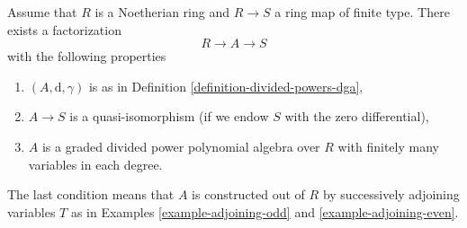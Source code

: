 \begin{lemma}
\label{lemma-tate-resolution}
Assume that $R$ is a Noetherian ring and
$R \to S$ a ring map of finite type. There exists a factorization
$$
R \to A \to S
$$
with the following properties
\begin{enumerate}
\item $(A, \text{d}, \gamma)$ is as in
Definition \ref{definition-divided-powers-dga},
\item $A \to S$ is a quasi-isomorphism (if we endow $S$ with
the zero differential),
\item $A$ is a graded divided power polynomial algebra over $R$
with finitely many variables in each degree.
\end{enumerate}
The last condition means that $A$ is constructed out of $R$ by
successively adjoining variables $T$ as in
Examples \ref{example-adjoining-odd} and \ref{example-adjoining-even}.
\end{lemma}

